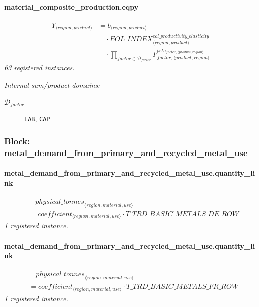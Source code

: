 \documentclass[11pt]{article}
\begin{document}
\paragraph{material\_composite\_production.eqpy}
\begin{align*}
Y_{\langle region, product\rangle} &= b_{\langle region, product\rangle}\\
&\quad {}\cdot {EOL\_INDEX}_{\langle region, product\rangle}^{eol\_productivity\_elasticity}\\
&\quad {}\cdot \prod_{factor \in \mathcal{D}_{factor}} F_{factor,\langle product, region\rangle}^{beta_{factor,\langle product, region\rangle}}
\end{align*}
\noindent\emph{63 registered instances.}\par
\noindent\emph{Internal sum/product domains:}\par
\begin{description}
\item[\(\mathcal{D}_{factor}\)] \texttt{LAB}, \texttt{CAP}
\end{description}
\subsubsection*{Block: metal\_demand\_from\_primary\_and\_recycled\_metal\_use}
\paragraph{metal\_demand\_from\_primary\_and\_recycled\_metal\_use.quantity\_link}
\begin{align*}
&\quad {physical\_tonnes}_{\langle region, material, use\rangle}\\
&= coefficient_{\langle region, material, use\rangle} \cdot T\_TRD\_BASIC\_METALS\_DE\_ROW
\end{align*}
\noindent\emph{1 registered instance.}\par
\paragraph{metal\_demand\_from\_primary\_and\_recycled\_metal\_use.quantity\_link}
\begin{align*}
&\quad {physical\_tonnes}_{\langle region, material, use\rangle}\\
&= coefficient_{\langle region, material, use\rangle} \cdot T\_TRD\_BASIC\_METALS\_FR\_ROW
\end{align*}
\noindent\emph{1 registered instance.}\par
\end{document}
